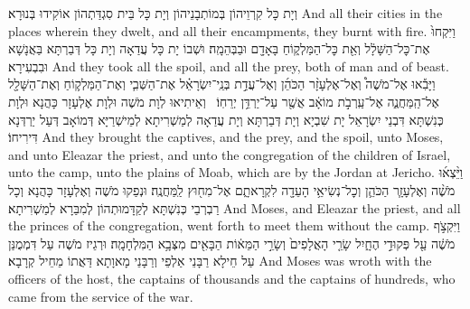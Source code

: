 {וְיָת כָּל קִרְוֵיהוֹן בְּמוֹתְבָנֵיהוֹן וְיָת כָּל בֵּית סִגְדַּתְהוֹן אוֹקִידוּ בְּנוּרָא׃}
{And all their cities in the places wherein they dwelt, and all their encampments, they burnt with fire.}{}
{וַיִּקְחוּ֙ אֶת־כׇּל־הַשָּׁלָ֔ל וְאֵ֖ת כׇּל־הַמַּלְק֑וֹחַ בָּאָדָ֖ם וּבַבְּהֵמָֽה׃
}
{וּשְׁבוֹ יָת כָּל עֲדַאָה וְיָת כָּל דְּבַרְתָּא בַּאֲנָשָׁא וּבִבְעִירָא׃}
{And they took all the spoil, and all the prey, both of man and of beast.}{}
{וַיָּבִ֡אוּ אֶל־מֹשֶׁה֩ וְאֶל־אֶלְעָזָ֨ר הַכֹּהֵ֜ן וְאֶל־עֲדַ֣ת בְּנֵֽי־יִשְׂרָאֵ֗ל אֶת־הַשְּׁבִ֧י וְאֶת־הַמַּלְק֛וֹחַ וְאֶת־הַשָּׁלָ֖ל אֶל־הַֽמַּחֲנֶ֑ה אֶל־עַֽרְבֹ֣ת מוֹאָ֔ב אֲשֶׁ֖ר עַל־יַרְדֵּ֥ן יְרֵחֽוֹ׃ \setuma }
{וְאֵיתִיאוּ לְוָת מֹשֶׁה וּלְוָת אֶלְעָזָר כָּהֲנָא וּלְוָת כְּנִשְׁתָּא דִּבְנֵי יִשְׂרָאֵל יָת שִׁבְיָא וְיָת דְּבַרְתָּא וְיָת עֲדַאָה לְמַשְׁרִיתָא לְמֵישְׁרַיָּא דְּמוֹאָב דְּעַל יַרְדְּנָא דִּירִיחוֹ׃}
{And they brought the captives, and the prey, and the spoil, unto Moses, and unto Eleazar the priest, and unto the congregation of the children of Israel, unto the camp, unto the plains of Moab, which are by the Jordan at Jericho.}{}
{וַיֵּ֨צְא֜וּ מֹשֶׁ֨ה וְאֶלְעָזָ֧ר הַכֹּהֵ֛ן וְכׇל־נְשִׂיאֵ֥י הָעֵדָ֖ה לִקְרָאתָ֑ם אֶל־מִח֖וּץ לַֽמַּחֲנֶֽה׃
}
{וּנְפַקוּ מֹשֶׁה וְאֶלְעָזָר כָּהֲנָא וְכָל רַבְרְבֵי כְּנִשְׁתָּא לְקַדָּמוּתְהוֹן לְמִבַּרָא לְמַשְׁרִיתָא׃}
{And Moses, and Eleazar the priest, and all the princes of the congregation, went forth to meet them without the camp.}{}
{וַיִּקְצֹ֣ף מֹשֶׁ֔ה עַ֖ל פְּקוּדֵ֣י הֶחָ֑יִל שָׂרֵ֤י הָאֲלָפִים֙ וְשָׂרֵ֣י הַמֵּא֔וֹת הַבָּאִ֖ים מִצְּבָ֥א הַמִּלְחָמָֽה׃
}
{וּרְגֵיז מֹשֶׁה עַל דִּמְמֻנַּן עַל חֵילָא רַבָּנֵי אַלְפֵי וְרַבָּנֵי מָאוָתָא דַּאֲתוֹ מֵחֵיל קְרָבָא׃}
{And Moses was wroth with the officers of the host, the captains of thousands and the captains of hundreds, who came from the service of the war.}{}
